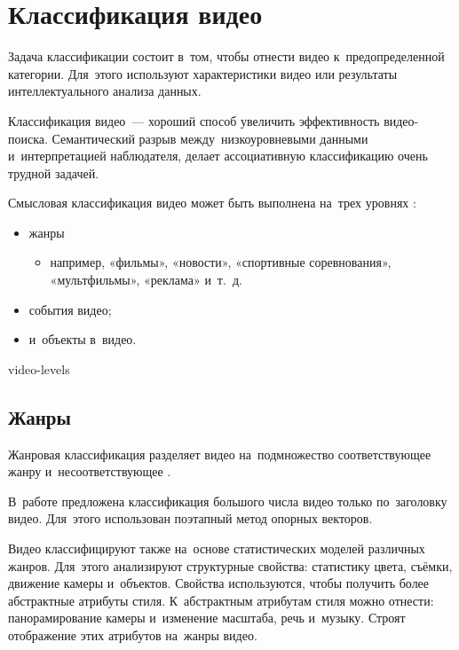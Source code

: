 

\section{Классификация видео}

Задача классификации состоит в~том,
чтобы отнести видео к~предопределенной категории.
Для~этого используют характеристики видео или
результаты интеллектуального анализа данных.

Классификация видео~— хороший способ увеличить
эффективность видео-поиска.
Семантический разрыв между~низкоуровневыми данными
и~интерпретацией наблюдателя, делает ассоциативную классификацию
очень трудной задачей.

Смысловая классификация видео может быть выполнена
на~трех уровнях \cite{Tamizharasan:2013}:
\begin{itemize}
    \item жанры
    \begin{itemize}
        \item например, «фильмы», «новости»,
                «спортивные соревнования», «мультфильмы», «реклама» и~т.~д.
    \end{itemize}
    \item события видео;
    \item и~объекты в~видео.
\end{itemize}


\begin{figuredt}
    {video-levels}
\end{figuredt}



\subsection{Жанры}

Жанровая классификация разделяет видео на~подмножество соответствующее жанру
и~несоответствующее \cite{Wu:2012}.

В~работе \cite{Jiang:2007} предложена классификация большого числа
видео только по~заголовку видео.
Для~этого использован поэтапный метод опорных
векторов.

Видео классифицируют также на~основе статистических моделей различных жанров.
Для~этого анализируют структурные свойства:
статистику цвета, съёмки, движение камеры и~объектов.
Свойства используются, чтобы получить более абстрактные атрибуты стиля.
К~абстрактным атрибутам стиля можно отнести:
панорамирование камеры и~изменение масштаба, речь и~музыку.
Строят отображение этих атрибутов на~жанры видео.

